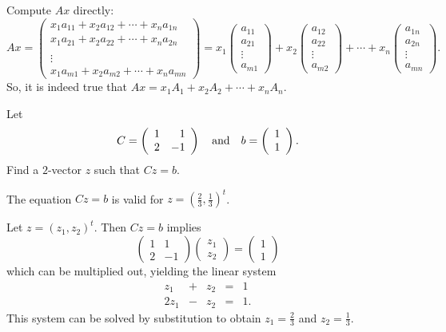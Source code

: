 \documentclass{ximera}
\begin{document}
\begin{exercise}
\begin{solution}
Compute $Ax$ directly:
\[ Ax = \left(\begin{array}{c} x_1a_{11} + x_2a_{12} + \cdots +
x_na_{1n} \\  x_1a_{21} + x_2a_{22} + \cdots + x_na_{2n} \\
\\ \vdots \\ x_1a_{m1} + x_2a_{m2} + \cdots + x_na_{mn}
\end{array}\right) = x_1\left(\begin{array}{r} a_{11} \\ a_{21} \\
\vdots \\ a_{m1} \end{array}\right) + x_2\left(\begin{array}{r}
a_{12} \\ a_{22} \\ \vdots \\ a_{m2} \end{array}\right) + \cdots
+ x_n\left(\begin{array}{r} a_{1n} \\ a_{2n} \\
\vdots \\ a_{mn} \end{array}\right). \]
So, it is indeed true that $Ax = x_1A_1 + x_2A_2 + \cdots
+ x_nA_n$.


\end{solution}
\end{exercise}


\begin{exercise} \label{c4.1.3}
Let
\[
C = \left(\begin{array}{rr} 1 & 1\\ 2 &-1\end{array}\right) \quad\mbox{and}\quad b = \left(\begin{array}{r} 1 \\ 1\end{array}\right).
\]
Find a $2$-vector $z$ such that $Cz=b$.

\begin{solution}

\ans The equation $Cz = b$ is valid for $z = (\frac{2}{3},\frac{1}{3})^t$.

\soln Let $z = (z_1,z_2)^t$.  Then $Cz = b$ implies
\[
\left(\begin{array}{rr} 1 & 1 \\ 2 & -1\end{array}\right)
\left(\begin{array}{r} z_1 \\ z_2\end{array}\right) =
\left(\begin{array}{r} 1 \\ 1\end{array}\right)
\]
which can be multiplied out, yielding the linear system
\[\begin{array}{rrrrl}
z_1 & + & z_2 & = & 1 \\
2z_1 & - & z_2 & = & 1.\end{array} \]
This system can be solved by substitution to obtain $z_1 =
\frac{2}{3}$ and $z_2 = \frac{1}{3}$.

\end{solution}
\end{exercise}
\end{document}
